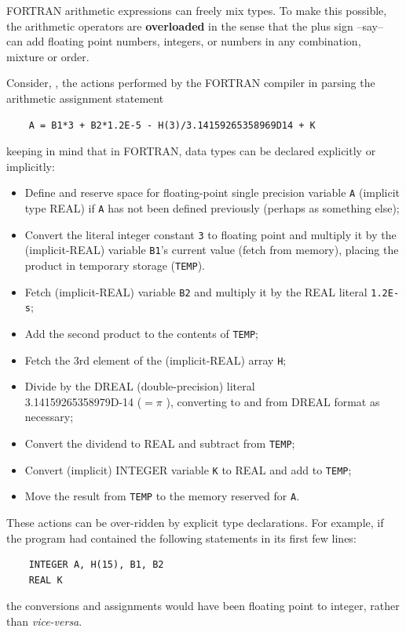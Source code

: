 FORTRAN arithmetic expressions can freely mix types. To make this possible, the arithmetic operators are \textbf{overloaded} in the sense that the plus sign --say-- can add floating point numbers, integers, or numbers in any combination, mixture or order.

Consider, \eg, the actions performed by the FORTRAN compiler in parsing the arithmetic assignment statement 

\begin{verbatim}
    A = B1*3 + B2*1.2E-5 - H(3)/3.14159265358969D14 + K
\end{verbatim}

keeping in mind that in FORTRAN, data types can be declared explicitly or implicitly:
\begin{itemize}
    \item Define and reserve space for floating-point single precision variable \verb|A| (implicit type REAL) if \verb|A| has not been defined previously (perhaps as something else);
    \item Convert the literal integer constant \verb|3| to floating point and multiply it by the (implicit-REAL) variable \verb|B1|'s current value (fetch from memory), placing the product in temporary storage (\verb|TEMP|).
    \item Fetch (implicit-REAL) variable \verb|B2| and multiply it by the REAL literal \verb|1.2E-s|;
    \item Add the second product to the contents of \verb|TEMP|;
    \item Fetch the 3rd element of the (implicit-REAL) array \verb|H|;
    \item Divide by the DREAL (double-precision) literal \\ \mbox{3.14159265358979D-14} ($= \pi$ ), converting to and from DREAL format as necessary;
    \item Convert the dividend to REAL and subtract from \verb|TEMP|;
    \item Convert (implicit) INTEGER variable \verb|K| to REAL and add to \verb|TEMP|;
    \item Move the result from \verb|TEMP| to the memory reserved for \verb|A|.
\end{itemize}

These actions can be over-ridden by explicit type declarations. For example, if the program had contained the following statements in its first few lines:
\begin{verbatim}
    INTEGER A, H(15), B1, B2 
    REAL K
\end{verbatim}
the conversions and assignments would have been floating point to integer, rather than \textit{vice-versa}.

